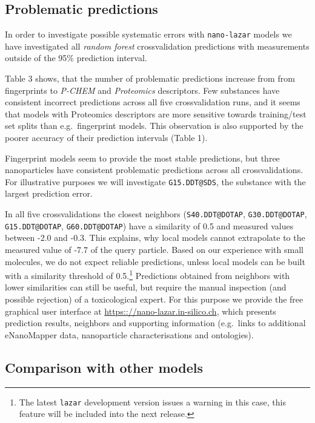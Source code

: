 \documentclass[utf8]{frontiersHLTH} %
\begin{document}
\subsection{Problematic predictions}\label{problematic-predictions}

In order to investigate possible systematic errors with
\texttt{nano-lazar} models we have investigated all \emph{random forest}
crossvalidation predictions with measurements outside of the 95\%
prediction interval.

Table 3 shows, that the number of problematic predictions increase from
from fingerprints to \emph{P-CHEM} and \emph{Proteomics} descriptors.
Few substances have consistent incorrect predictions across all five
crossvalidation runs, and it seems that models with Proteomics
descriptors are more sensitive towards training/test set splits than
e.g.~fingerprint models. This observation is also supported by the
poorer accuracy of their prediction intervals (Table 1).

Fingerprint models seem to provide the most stable predictions, but
three nanoparticles have consistent problematic predictions across all
crossvalidations. For illustrative purposes we will investigate
\texttt{G15.DDT@SDS}, the substance with the largest prediction error.

In all five crossvalidations the closest neighbors
(\texttt{S40.DDT@DOTAP}, \texttt{G30.DDT@DOTAP}, \texttt{G15.DDT@DOTAP},
\texttt{G60.DDT@DOTAP}) have a similarity of 0.5 and measured values
between -2.0 and -0.3. This explains, why local models cannot
extrapolate to the measured value of -7.7 of the query particle. Based
on our experience with small molecules, we do not expect reliable
predictions, unless local models can be built with a similarity
threshold of 0.5.\footnote{The latest \texttt{lazar} development version
  issues a warning in this case, this feature will be included into the
  next release.} Predictions obtained from neighbors with lower
similarities can still be useful, but require the manual inspection (and
possible rejection) of a toxicological expert. For this purpose we
provide the free graphical user interface at
\url{https:://nano-lazar.in-silico.ch}, which presents prediction
results, neighbors and supporting information (e.g.~links to additional
eNanoMapper data, nanoparticle characterisations and ontologies).

\subsection{Comparison with other
models}\label{comparison-with-other-models}
\end{document}

